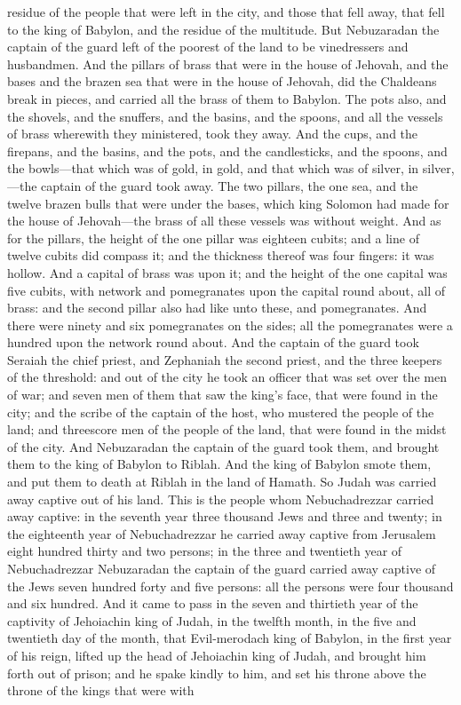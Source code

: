 residue of the people that were left in the city, and those that fell away, that fell to the king of Babylon, and the residue of the multitude. But Nebuzaradan the captain of the guard left of the poorest of the land to be vinedressers and husbandmen.  And the pillars of brass that were in the house of Jehovah, and the bases and the brazen sea that were in the house of Jehovah, did the Chaldeans break in pieces, and carried all the brass of them to Babylon. The pots also, and the shovels, and the snuffers, and the basins, and the spoons, and all the vessels of brass wherewith they ministered, took they away. And the cups, and the firepans, and the basins, and the pots, and the candlesticks, and the spoons, and the bowls—that which was of gold, in gold, and that which was of silver, in silver,—the captain of the guard took away. The two pillars, the one sea, and the twelve brazen bulls that were under the bases, which king Solomon had made for the house of Jehovah—the brass of all these vessels was without weight. And as for the pillars, the height of the one pillar was eighteen cubits; and a line of twelve cubits did compass it; and the thickness thereof was four fingers: it was hollow. And a capital of brass was upon it; and the height of the one capital was five cubits, with network and pomegranates upon the capital round about, all of brass: and the second pillar also had like unto these, and pomegranates. And there were ninety and six pomegranates on the sides; all the pomegranates were a hundred upon the network round about.  And the captain of the guard took Seraiah the chief priest, and Zephaniah the second priest, and the three keepers of the threshold: and out of the city he took an officer that was set over the men of war; and seven men of them that saw the king’s face, that were found in the city; and the scribe of the captain of the host, who mustered the people of the land; and threescore men of the people of the land, that were found in the midst of the city. And Nebuzaradan the captain of the guard took them, and brought them to the king of Babylon to Riblah. And the king of Babylon smote them, and put them to death at Riblah in the land of Hamath. So Judah was carried away captive out of his land.  This is the people whom Nebuchadrezzar carried away captive: in the seventh year three thousand Jews and three and twenty; in the eighteenth year of Nebuchadrezzar he carried away captive from Jerusalem eight hundred thirty and two persons; in the three and twentieth year of Nebuchadrezzar Nebuzaradan the captain of the guard carried away captive of the Jews seven hundred forty and five persons: all the persons were four thousand and six hundred.  And it came to pass in the seven and thirtieth year of the captivity of Jehoiachin king of Judah, in the twelfth month, in the five and twentieth day of the month, that Evil-merodach king of Babylon, in the first year of his reign, lifted up the head of Jehoiachin king of Judah, and brought him forth out of prison; and he spake kindly to him, and set his throne above the throne of the kings that were with 